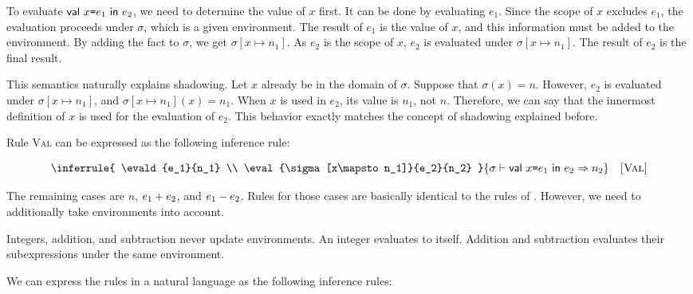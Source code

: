 To evaluate $\textsf{val}\ x\texttt{=} e_1\ \textsf{in}\ e_2$, we need to determine the value of $x$ first.
It can be done by evaluating $e_1$. Since the scope of $x$ excludes $e_1$,
the evaluation proceeds under $\sigma$, which is a given environment.
The result of $e_1$ is the value of $x$, and this information must be added to
the environment. By adding the fact to $\sigma$, we get $\sigma[x\mapsto n_1]$.
As $e_2$ is the scope of $x$, $e_2$ is evaluated under $\sigma[x\mapsto n_1]$.
The result of $e_2$ is the final result.

This semantics naturally explains shadowing. Let $x$ already be in the domain of
$\sigma$. Suppose that $\sigma(x)=n$. However, $e_2$ is evaluated under
$\sigma[x\mapsto n_1]$, and $\sigma[x\mapsto n_1](x)=n_1$. When $x$ is used in
$e_2$, its value is $n_1$, not $n$. Therefore, we can say that the
innermost definition of $x$ is used for the evaluation of $e_2$. This behavior
exactly matches the concept of shadowing explained before.

Rule \textsc{Val} can be expressed as the following inference rule:

\[
\inferrule
{
  \evald{e_1}{n_1} \\
  \eval{\sigma[x\mapsto n_1]}{e_2}{n_2}
}
{ \evald{\ebind{x}{e_1}{e_2}}{n_2} }
\quad\textsc{[Val]}
\]

The remaining cases are $n$, $e_1+e_2$, and $e_1-e_2$.
Rules for those cases are basically identical to the rules of \plang.
However, we need to additionally take environments into account.


\vspace{-1em}


\vspace{-1em}


Integers, addition, and subtraction never update environments.
An integer evaluates to itself. Addition and subtraction evaluates their
subexpressions under the same environment.

We can express the rules in a natural language as the following inference rules:

